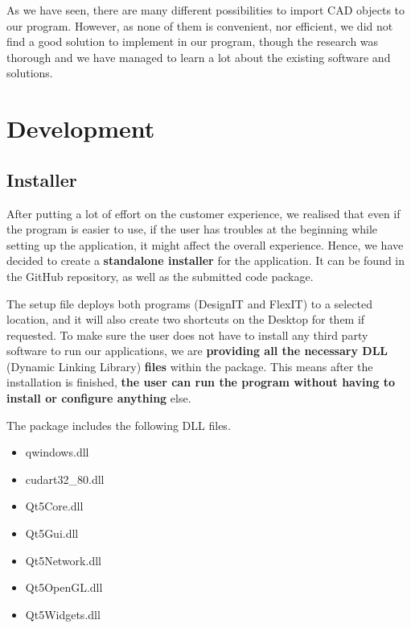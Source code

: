 \documentclass[a4paper, 11pt, article]{report}
\begin{document}
As we have seen, there are many different possibilities to import CAD objects to our program. However, as none of them is convenient, nor efficient, we did not find a good solution to implement in our program, though the research was thorough and we have managed to learn a lot about the existing software and solutions.
   

\chapter{Development}

\section{Installer}

After putting a lot of effort on the customer experience, we realised that even if the program is easier to use, if the user has troubles at the beginning while setting up the application, it might affect the overall experience. Hence, we have decided to create a \textbf{standalone installer} for the application. It can be found in the GitHub repository, as well as the submitted code package.

The setup file deploys both programs (DesignIT and FlexIT) to a selected location, and it will also create two shortcuts on the Desktop for them if requested. To make sure the user does not have to install any third party software to run our applications, we are \textbf{providing all the necessary DLL} (Dynamic Linking Library) \textbf{files} within the package. This means after the installation is finished, \textbf{the user can run the program without having to install or configure anything} else.

The package includes the following DLL files.

\begin{itemize}
\item qwindows.dll
\item cudart32\_80.dll
\item Qt5Core.dll
\item Qt5Gui.dll
\item Qt5Network.dll
\item Qt5OpenGL.dll
\item Qt5Widgets.dll
\end{itemize}
\end{document}
